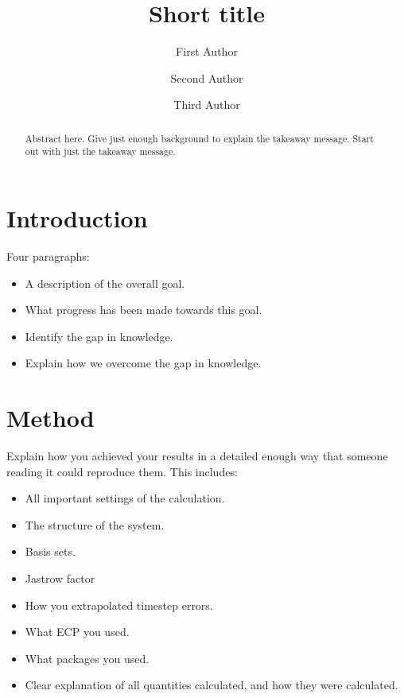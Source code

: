\documentclass[twocolumn]{revtex4-1}
\begin{document}
\title{Short title} 
\author{First Author}
\author{Second Author}
\author{Third Author}
\begin{abstract}
    Abstract here. Give just enough background to explain the takeaway message. Start out with just the takeaway message.
\end{abstract}
\maketitle

\section*{Introduction}

Four paragraphs:
\begin{itemize}
    \item A description of the overall goal.
    \item What progress has been made towards this goal.
    \item Identify the gap in knowledge.
    \item Explain how we overcome the gap in knowledge.
\end{itemize}

\section*{Method} 

Explain how you achieved your results in a detailed enough way that someone reading it could reproduce them. This includes:
\begin{itemize}
    \item All important settings of the calculation.
    \item The structure of the system.
    \item Basis sets.
    \item Jastrow factor
    \item How you extrapolated timestep errors.
    \item What ECP you used.
    \item What packages you used.
    \item Clear explanation of all quantities calculated, and how they were calculated.
\end{itemize}
\end{document}
